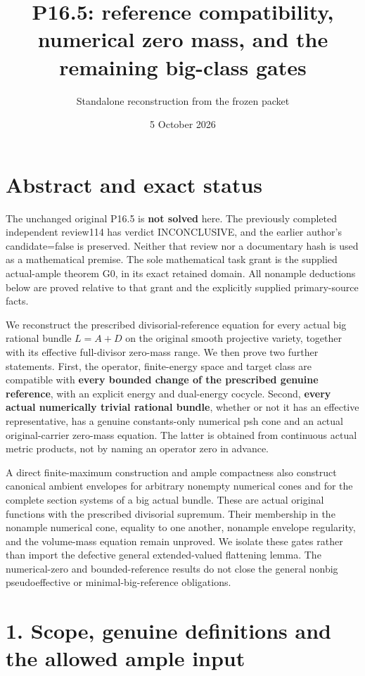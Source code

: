 \documentclass[
  10pt,
]{article}
\title{P16.5: reference compatibility, numerical zero mass, and the
remaining big-class gates}
\author{Standalone reconstruction from the frozen packet}
\date{5 October 2026}
\begin{document}
\maketitle

\section{Abstract and exact status}\label{abstract-and-exact-status}

The unchanged original P16.5 is \textbf{not solved} here. The previously
completed independent review114 has verdict INCONCLUSIVE, and the
earlier author's candidate=false is preserved. Neither that review nor a
documentary hash is used as a mathematical premise. The sole
mathematical task grant is the supplied actual-ample theorem G0, in its
exact retained domain. All nonample deductions below are proved relative
to that grant and the explicitly supplied primary-source facts.

We reconstruct the prescribed divisorial-reference equation for every
actual big rational bundle \(L=A+D\) on the original smooth projective
variety, together with its effective full-divisor zero-mass range. We
then prove two further statements. First, the operator, finite-energy
space and target class are compatible with \textbf{every bounded change
of the prescribed genuine reference}, with an explicit energy and
dual-energy cocycle. Second, \textbf{every actual numerically trivial
rational bundle}, whether or not it has an effective representative, has
a genuine constants-only numerical psh cone and an actual
original-carrier zero-mass equation. The latter is obtained from
continuous actual metric products, not by naming an operator zero in
advance.

A direct finite-maximum construction and ample compactness also
construct canonical ambient envelopes for arbitrary nonempty numerical
cones and for the complete section systems of a big actual bundle. These
are actual original functions with the prescribed divisorial supremum.
Their membership in the nonample numerical cone, equality to one
another, nonample envelope regularity, and the volume-mass equation
remain unproved. We isolate these gates rather than import the defective
general extended-valued flattening lemma. The numerical-zero and
bounded-reference results do not close the general nonbig
pseudoeffective or minimal-big-reference obligations.

\section{1. Scope, genuine definitions and the allowed ample
input}\label{scope-genuine-definitions-and-the-allowed-ample-input}
\end{document}
